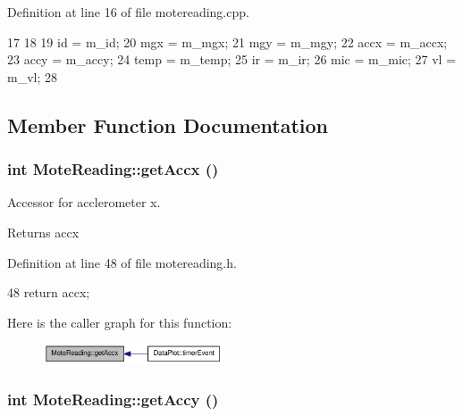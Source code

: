 Definition at line 16 of file motereading.cpp.




\begin{DoxyCode}
17  {
18 
19      id = m_id;
20      mgx = m_mgx;
21      mgy = m_mgy;
22      accx = m_accx;
23      accy = m_accy;
24      temp = m_temp;
25      ir = m_ir;
26      mic = m_mic;
27      vl = m_vl;
28  }
\end{DoxyCode}




\subsection{Member Function Documentation}
\hypertarget{classMoteReading_ad79a65f84dfaacc9b5c179fb66a5545f}{
\subsubsection[{getAccx}]{\setlength{\rightskip}{0pt plus 5cm}int MoteReading::getAccx ()}}
\label{classMoteReading_ad79a65f84dfaacc9b5c179fb66a5545f}


Accessor for acclerometer x. 

\begin{DoxyReturn}{Returns}
accx 
\end{DoxyReturn}


Definition at line 48 of file motereading.h.




\begin{DoxyCode}
48 { return accx; }
\end{DoxyCode}




Here is the caller graph for this function:\nopagebreak
\begin{figure}[H]
\begin{center}
\leavevmode
\includegraphics[width=151pt]{classMoteReading_ad79a65f84dfaacc9b5c179fb66a5545f_icgraph}
\end{center}
\end{figure}


\hypertarget{classMoteReading_af918c7ca6c9fea98a3d608b61dbaffae}{
\subsubsection[{getAccy}]{\setlength{\rightskip}{0pt plus 5cm}int MoteReading::getAccy ()}}
\label{classMoteReading_af918c7ca6c9fea98a3d608b61dbaffae}


